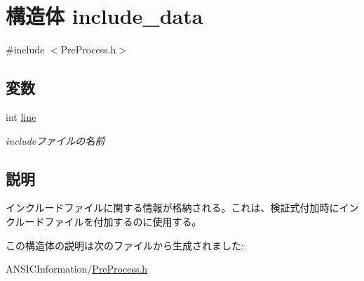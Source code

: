\section{構造体 include\_\-data}
\label{structinclude__data}


{\ttfamily \#include $<$PreProcess.h$>$}

\subsection*{変数}
\begin{DoxyCompactItemize}
\item 
int \hyperlink{structinclude__data_a45201a24f55b5f41717179ce2de083aa}{line}\label{structinclude__data_a45201a24f55b5f41717179ce2de083aa}

\begin{DoxyCompactList}\small\item\em includeファイルの名前 \item\end{DoxyCompactList}\end{DoxyCompactItemize}


\subsection{説明}
インクルードファイルに関する情報が格納される。これは、検証式付加時にインクルードファイルを付加するのに使用する。 

この構造体の説明は次のファイルから生成されました:\begin{DoxyCompactItemize}
\item 
ANSICInformation/\hyperlink{PreProcess_8h}{PreProcess.h}\end{DoxyCompactItemize}
